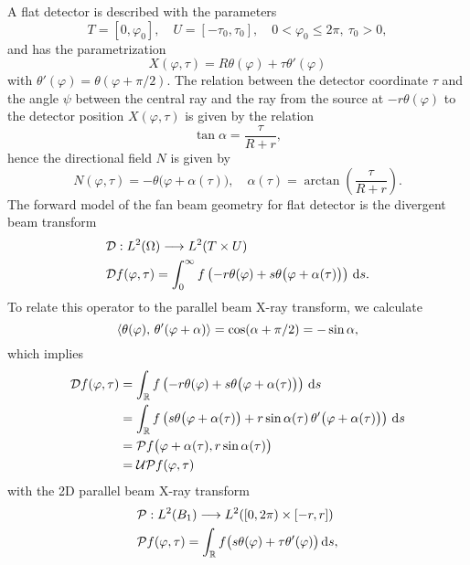 \documentclass{amsart}
\renewcommand*{\phi}{\varphi}
\begin{document}
A flat detector is described with the parameters
%
\begin{equation}
 \label{eq:fanflat:params}
 T = [0, \phi_0], \quad U = [-\tau_0, \tau_0], \quad 0 < \phi_0 \leq 2\pi,\ \tau_0 > 0,
\end{equation}
%
and has the parametrization
%
\begin{equation}
 \label{eq:fanflat:detector_parametr_alt}
 X(\phi, \tau) = R \theta(\phi) + \tau \theta'(\phi)
\end{equation}
%
with $\theta'(\phi) = \theta(\phi + \pi/2)$. The relation between the detector coordinate $\tau$ and the angle $\psi$ between the 
central ray and the ray from the source at $-r \theta(\phi)$ to the detector position $X(\phi,\tau)$ is given by the relation
%
\begin{equation*}
 \tan\alpha = \frac{\tau}{R + r},
\end{equation*}
%
hence the directional field $N$ is given by
%
\begin{equation}
 \label{eq:fanflat:dirfield}
 N(\phi, \tau) = -\theta\big(\phi + \alpha(\tau)\big), \quad \alpha(\tau) = \arctan\left( \frac{\tau}{R+r} \right) .
\end{equation} 
%
The forward model of the fan beam geometry for flat detector is the divergent beam transform
%
\begin{align}
 &\OPD: L^2(\Omega) \Lto L^2(T \times U) \notag \\
 \label{eq:fanflat:fwdproj}
 &\OPD f(\phi, \tau) = \int_0^\infty f\left(-r \theta(\phi) + s \theta\big(\phi + \alpha(\tau)\big) \right)\, \D s.
\end{align}
%
To relate this operator to the parallel beam X-ray transform, we calculate
%
\begin{equation*}
 \INNER{\theta(\phi)}{\theta'(\phi+\alpha)} = \cos(\alpha + \pi/2) = -\sin\alpha,
\end{equation*}
%
which implies
%
\begin{align*}
 \OPD f(\phi, \tau) 
 &= \int_\RR f \left( -r \theta(\phi) + s \theta\big(\phi + \alpha(\tau)\big) \right)\, \D s \\
 &= \int_\RR f \left( s \theta\big(\phi + \alpha(\tau)\big) + r\sin\alpha(\tau)\, \theta'\big(\phi + \alpha(\tau)\big) \right)\, 
 \D s \\
 &= \OPP f \big(\phi + \alpha(\tau), r\sin\alpha(\tau)\big) \\
 &= \OPU \OPP f(\phi, \tau)
\end{align*}
%
with the 2D parallel beam X-ray transform
%
\begin{align}
 &\OPP: L^2(B_1) \Lto L^2([0,2\pi) \times [-r,r]) \notag \\
 \label{eq:fanflat:xray_fwdproj}
 &\OPP f(\phi, \tau) = \int_\RR f\big(s\theta(\phi) + \tau \theta'(\phi)\big)\, \D s,
\end{align} 
\end{document}
